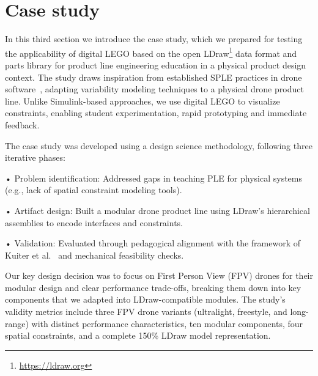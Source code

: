 \documentclass[sigconf,review]{acmart}
\begin{document}
\section{Case study}
\label{sec:case-study}

In this third section we introduce the case study, which we prepared for testing the applicability of digital LEGO based on the open LDraw\footnote{\url{https://ldraw.org}} data format and parts library for product line engineering education in a physical product design context.
The study draws inspiration from established SPLE practices in drone software~\cite{Steiner_2014}, adapting variability modeling techniques to a physical drone product line. 
Unlike Simulink-based approaches, we use digital LEGO to visualize constraints, enabling student experimentation, rapid prototyping and immediate feedback.

The case study was developed using a design science methodology, following three iterative phases:

•	Problem identification: Addressed gaps in teaching PLE for physical systems (e.g., lack of spatial constraint modeling tools).

•	Artifact design: Built a modular drone product line using LDraw’s hierarchical assemblies to encode interfaces and constraints.

•	Validation: Evaluated through pedagogical alignment with the framework of Kuiter et al.~\cite{Kuiter_2025} and mechanical feasibility checks.

Our key design decision was to focus on First Person View (FPV) drones for their modular design and clear performance trade-offs, breaking them down into key components that we adapted into LDraw-compatible modules. 
The study's validity metrics include three FPV drone variants (ultralight, freestyle, and long-range) with distinct performance characteristics, ten modular components, four spatial constraints, and a complete 150\% LDraw model representation.
\end{document}
